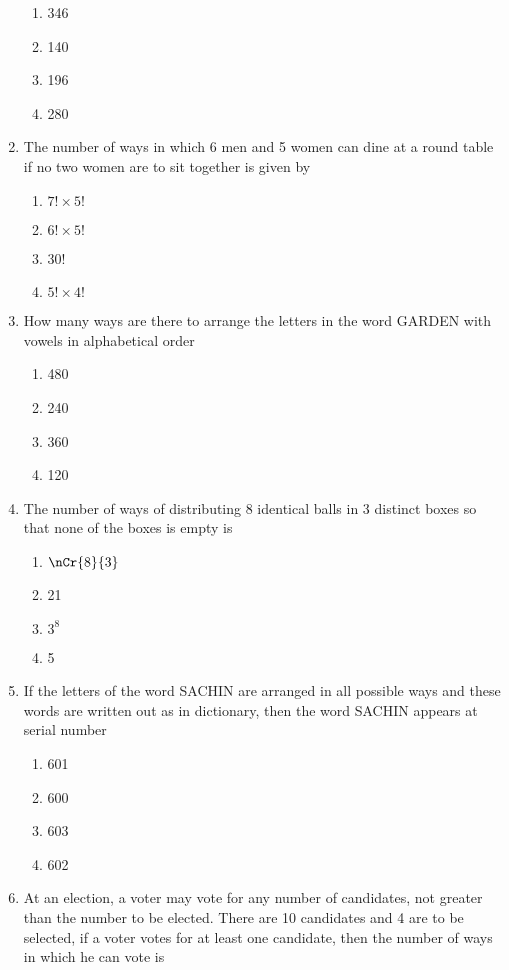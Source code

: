 \begin{enumerate}[label=\arabic*.,ref=\thesubsection.\theenumi]
\begin{enumerate}
\item 346
\item 140 
\item 196
\item 280\\
\end{enumerate}
\item The number of ways in which 6 men and 5 women can dine at a round table if no two women are to sit together is given by
\begin{enumerate}
\item $7! \times 5!$
\item $6! \times 5!$
\item 30!
\item $5! \times 4!$\\
\end{enumerate}
\item How many ways are there to arrange the letters in the word GARDEN with vowels in alphabetical order
\begin{enumerate}
\item 480
\item 240 
\item 360
\item 120\\
\end{enumerate}
\item The number of ways of distributing 8 identical balls in 3 distinct boxes so that none of the boxes is empty is 
\begin{enumerate}
\item $\nCr{8}{3}$
\item 21
\item $3^8$
\item 5\\
\end{enumerate}
\item If the letters of the word SACHIN are arranged in all possible ways and these words are written out as in dictionary, then the word SACHIN appears at serial number
\begin{enumerate}
\item 601
\item 600 
\item 603
\item 602\\
\end{enumerate}
\item At an election, a voter may vote for any number of candidates, not greater than the number to be elected. There are 10 candidates and 4 are to be selected, if a voter votes for at least one candidate, then the number of ways in which he can vote is

\end{enumerate}
